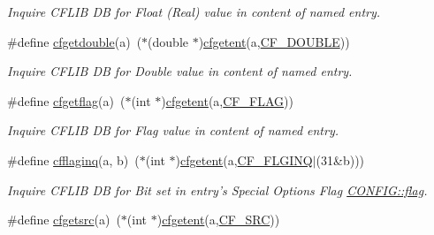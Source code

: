 \begin{DoxyCompactItemize}
\begin{DoxyCompactList}\small\item\em Inquire C\-F\-L\-I\-B D\-B for Float (Real) value in content of named entry. \end{DoxyCompactList}\item 
\hypertarget{group__retrieval_gafd754dc010651581fe1cc2c7fa6c2dd6}{\#define \hyperlink{group__retrieval_gafd754dc010651581fe1cc2c7fa6c2dd6}{cfgetdouble}(a)~($\ast$(double $\ast$)\hyperlink{group__retrieval_gac13ba743ed26e6c05df14817ad9df3da}{cfgetent}(a,\hyperlink{group__special__options__mask_ga8d4f049e4c8022b03b7979ac3f0db04b}{C\-F\-\_\-\-D\-O\-U\-B\-L\-E}))}\label{group__retrieval_gafd754dc010651581fe1cc2c7fa6c2dd6}

\begin{DoxyCompactList}\small\item\em Inquire C\-F\-L\-I\-B D\-B for Double value in content of named entry. \end{DoxyCompactList}\item 
\#define \hyperlink{group__retrieval_gac0188464b59267e14b5c44efb1d4a0f2}{cfgetflag}(a)~($\ast$(int $\ast$)\hyperlink{group__retrieval_gac13ba743ed26e6c05df14817ad9df3da}{cfgetent}(a,\hyperlink{group__special__options__mask_ga1d1f1d1b6eac6b5d9970102318ab2667}{C\-F\-\_\-\-F\-L\-A\-G}))
\begin{DoxyCompactList}\small\item\em Inquire C\-F\-L\-I\-B D\-B for Flag value in content of named entry. \end{DoxyCompactList}\item 
\#define \hyperlink{group__retrieval_ga09929d4a48932749dd9d0d32d0f3f08c}{cfflaginq}(a, b)~($\ast$(int $\ast$)\hyperlink{group__retrieval_gac13ba743ed26e6c05df14817ad9df3da}{cfgetent}(a,\hyperlink{group__special__options__mask_ga36792935eec7c6636b6aea8df82f7480}{C\-F\-\_\-\-F\-L\-G\-I\-N\-Q}$|$(31\&b)))
\begin{DoxyCompactList}\small\item\em Inquire C\-F\-L\-I\-B D\-B for Bit set in entry's Special Options Flag \hyperlink{struct_c_o_n_f_i_g_ab04d08abdf758c0400caaded716f4089}{C\-O\-N\-F\-I\-G\-::flag}. \end{DoxyCompactList}\item 
\#define \hyperlink{group__retrieval_gadf84eed41bdaa0a6cd8cd474c79d50b1}{cfgetsrc}(a)~($\ast$(int $\ast$)\hyperlink{group__retrieval_gac13ba743ed26e6c05df14817ad9df3da}{cfgetent}(a,\hyperlink{group__special__options__mask_gad9b1f659b11c529a0ed1035caf8b239b}{C\-F\-\_\-\-S\-R\-C}))

\end{DoxyCompactItemize}
